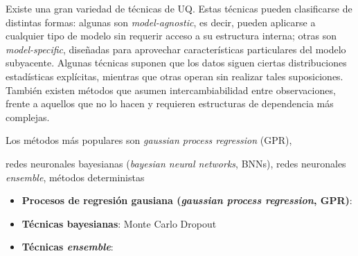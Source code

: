 Existe una gran variedad de técnicas de UQ. Estas técnicas pueden clasificarse de distintas formas: algunas 
son \textit{model-agnostic}, es decir, pueden aplicarse a cualquier tipo de modelo sin 
requerir acceso a su estructura interna; otras son \textit{model-specific}, diseñadas para aprovechar 
características particulares del modelo subyacente. 
Algunas técnicas suponen que los datos siguen ciertas 
distribuciones estadísticas explícitas, mientras que otras operan sin realizar tales suposiciones. 
También existen métodos que asumen intercambiabilidad entre observaciones, frente a aquellos que no lo hacen 
y requieren estructuras de dependencia más complejas. 

Los métodos más populares son \textit{gaussian process regression} (GPR),

redes neuronales bayesianas (\textit{bayesian neural networks}, BNNs),
redes neuronales \textit{ensemble}, 
métodos deterministas

\begin{itemize}
    \item \textbf{Procesos de regresión gausiana (\textit{gaussian process regression}, GPR)}: 
    
    \item \textbf{Técnicas bayesianas}: Monte Carlo Dropout

    \item \textbf{Técnicas \textit{ensemble}}:  
\end{itemize}










    

